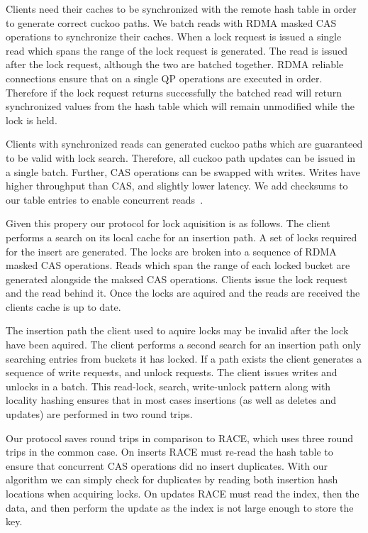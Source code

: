 Clients need their caches to be synchronized with the remote
hash table in order to generate correct cuckoo paths. We
batch reads with RDMA masked CAS operations to synchronize
their caches. When a lock request is issued a single read
which spans the range of the lock request is generated. The
read is issued after the lock request, although the two are
batched together. RDMA reliable connections ensure that on a
single QP operations are executed in order. Therefore if the
lock request returns successfully the batched read will
return synchronized values from the hash table which will
remain unmodified while the lock is held.

Clients with synchronized reads can generated cuckoo paths
which are guaranteed to be valid with lock search.
Therefore, all cuckoo path updates can be issued in a single
batch. Further, CAS operations can be swapped with writes.
Writes have higher throughput than CAS, and slightly lower
latency. We add checksums to our table entries to enable
concurrent reads~\cite{pilaf,cell}.  ~

Given this propery our protocol for lock aquisition is as
follows. The client performs a search on its local cache for
an insertion path. A set of locks required for the insert
are generated. The locks are broken into a sequence of RDMA
masked CAS operations. Reads which span the range of each
locked bucket are generated alongside the maksed CAS
operations. Clients issue the lock request and the read
behind it. Once the locks are aquired and the reads are
received the clients cache is up to date.

The insertion path the client used to aquire locks may be
invalid after the lock have been aquired. The client
performs a second search for an insertion path only
searching entries from buckets it has locked. If a path
exists the client generates a sequence of write requests,
and unlock requests. The client issues writes and unlocks in
a batch. This read-lock, search, write-unlock pattern along
with locality hashing ensures that in most cases insertions
(as well as deletes and updates) are performed in two round
trips.

Our protocol saves round trips in comparison to RACE, which
uses three round trips in the common case. On inserts RACE
must re-read the hash table to ensure that concurrent CAS
operations did no insert duplicates. With our algorithm we
can simply check for duplicates by reading both insertion
hash locations when acquiring locks. On updates RACE must
read the index, then the data, and then perform the update
as the index is not large enough to store the key. 

